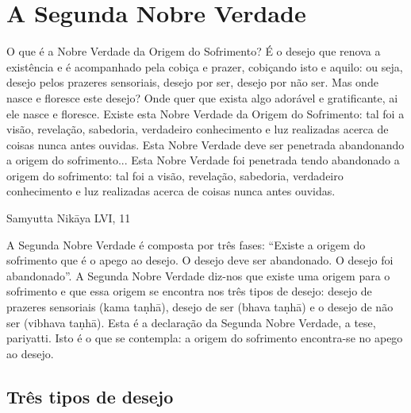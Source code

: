 \chapter{A Segunda Nobre Verdade}

O que é a Nobre Verdade da Origem do
Sofrimento? É o desejo que renova a existência e é
acompanhado pela cobiça e prazer, cobiçando isto
e aquilo: ou seja, desejo pelos prazeres sensoriais,
desejo por ser, desejo por não ser. Mas onde nasce
e floresce este desejo? Onde quer que exista algo
adorável e gratificante, ai ele nasce e floresce.
Existe esta Nobre Verdade da Origem do
Sofrimento: tal foi a visão, revelação, sabedoria,
verdadeiro conhecimento e luz realizadas acerca de
coisas nunca antes ouvidas.
Esta Nobre Verdade deve ser penetrada abandonando a origem do sofrimento...
Esta Nobre Verdade foi penetrada tendo
abandonado a origem do sofrimento: tal foi a visão,
revelação, sabedoria, verdadeiro conhecimento e
luz realizadas acerca de coisas nunca antes ouvidas.

Samyutta Nikāya LVI, 11

A Segunda Nobre Verdade é composta por três fases:
“Existe a origem do sofrimento que é o apego ao desejo. O
desejo deve ser abandonado. O desejo foi abandonado”.
A Segunda Nobre Verdade diz-nos que existe uma
origem para o sofrimento e que essa origem se encontra nos
três tipos de desejo: desejo de prazeres sensoriais (kama
taṇhā), desejo de ser (bhava taṇhā) e o desejo de não ser (vibhava taṇhā). Esta é a declaração da Segunda Nobre Verdade,
a tese, pariyatti. Isto é o que se contempla: a origem do sofrimento encontra-se no apego ao desejo.

\section{Três tipos de desejo}

